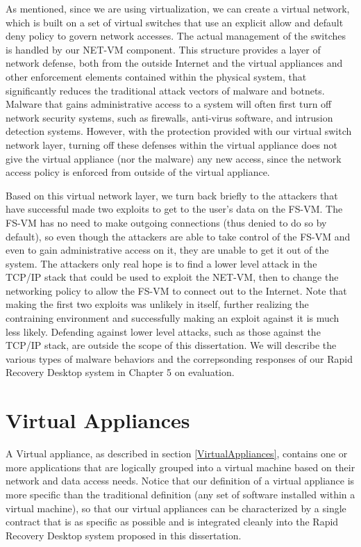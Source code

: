 As mentioned, since we are using virtualization, we can create a virtual network, which is built on a set of virtual switches that use an explicit allow and default deny policy to govern network accesses. The actual management of the switches is handled by our NET-VM component. This structure provides a layer of network defense, both from the outside Internet and the virtual appliances and other enforcement elements contained within the physical system, that significantly reduces the traditional attack vectors of malware and botnets. Malware that gains administrative access to a system will often first turn off network security systems, such as firewalls, anti-virus software, and intrusion detection systems. However, with the protection provided with our virtual switch network layer, turning off these defenses within the virtual appliance does not give the virtual appliance (nor the malware) any new access, since the network access policy is enforced from outside of the virtual appliance. 

Based on this virtual network layer, we turn back briefly to the attackers that have successful made two exploits to get to the user's data on the FS-VM. The FS-VM has no need to make outgoing connections (thus denied to do so by default), so even though the attackers are able to take control of the FS-VM and even to gain administrative access on it, they are unable to get it out of the system. The attackers only real hope is to find a lower level attack in the TCP/IP stack that could be used to exploit the NET-VM, then to change the networking policy to allow the FS-VM to connect out to the Internet. Note that making the first two exploits was unlikely in itself, further realizing the contraining environment and successfully making an exploit against it is much less likely. Defending against lower level attacks, such as those against the TCP/IP stack, are outside the scope of this dissertation. We will describe the various types of malware behaviors and the correpsonding responses of our Rapid Recovery Desktop system in Chapter 5 on evaluation.

\section{Virtual Appliances}

A Virtual appliance, as described in section \ref{VirtualAppliances}, contains one or more applications that are logically grouped into a virtual machine based on their network and data access needs. Notice that our definition of a virtual appliance is more specific than the traditional definition (any set of software installed within a virtual machine), so that our virtual appliances can be characterized by a single contract that is as specific as possible and is integrated cleanly into the Rapid Recovery Desktop system proposed in this dissertation. 

